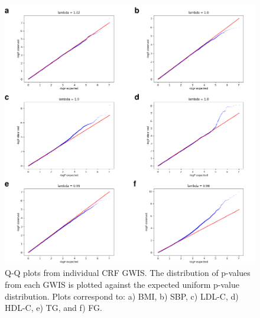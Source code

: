 \documentclass[]{article}
\begin{document}
\begin{figure}
\centering
\includegraphics{figures/show-qq-plots-1.pdf}
\caption{Q-Q plots from individual CRF GWIS. The distribution of
p-values from each GWIS is plotted against the expected uniform p-value
distribution. Plots correspond to: a) BMI, b) SBP, c) LDL-C, d) HDL-C,
e) TG, and f) FG.}
\end{figure}
\end{document}

